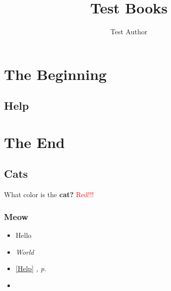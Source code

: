\documentclass[10pt, openany]{book}
\begin{document}
\title{Test Books}
\author{Test Author}
\date{ }
\maketitle
\tableofcontents
\part{The Beginning}
\chapter{Help}
\label{Help}
\part{The End}
\chapter{Cats}
What color is the \textbf{cat?}
\textcolor{red}{Red!!!}
\section{Meow}
\begin{itemize}
\item{Hello}
\item{\textit{World}}
\item{\autoref{Help} \textit{, p. \pageref{Help} }}
\item{}
\end{itemize}
\printindex
\end{document}
